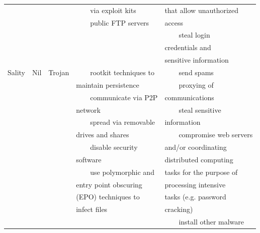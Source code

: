 \documentclass[12pt]{article}
\newcommand{\tabitem}{~~\llap{\textbullet}~~}
\begin{document}
\begin{table}[!htbp]
\begin{tabular}{lllll}
&&&\tabitem via exploit kits &that allow unauthorized \\
&&&\tabitem public FTP servers &access \\
&&&&\tabitem steal login \\
&&&&credentials and \\
&&&&sensitive information  \\
Sality &Nil     &Trojan     &\tabitem rootkit techniques to &\tabitem send spams \\
&&&maintain persistence &\tabitem proxying of \\
&&&\tabitem communicate via P2P &communications \\
&&&network &\tabitem steal sensitive \\
&&&\tabitem spread via removable &information \\
&&&drives and shares &\tabitem compromise web servers \\
&&&\tabitem disable security &and/or coordinating \\
&&&software &distributed computing \\
&&&\tabitem use polymorphic and &tasks for the purpose of \\
&&&entry point obscuring &processing intensive \\
&&&(EPO) techniques to &tasks (e.g. password \\
&&&infect files &cracking) \\
&&&&\tabitem install other malware \\
\hline
\end{tabular}
\end{table}
\end{document}
